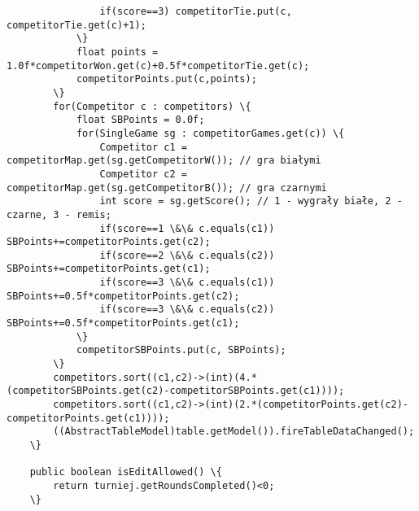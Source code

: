 \begin{verbatim}
				if(score==3) competitorTie.put(c, competitorTie.get(c)+1);
			\}
			float points = 1.0f*competitorWon.get(c)+0.5f*competitorTie.get(c);
			competitorPoints.put(c,points);
		\}
		for(Competitor c : competitors) \{
			float SBPoints = 0.0f;
			for(SingleGame sg : competitorGames.get(c)) \{
				Competitor c1 = competitorMap.get(sg.getCompetitorW()); // gra białymi
				Competitor c2 = competitorMap.get(sg.getCompetitorB()); // gra czarnymi
				int score = sg.getScore(); // 1 - wygrały białe, 2 - czarne, 3 - remis;
				if(score==1 \&\& c.equals(c1)) SBPoints+=competitorPoints.get(c2);
				if(score==2 \&\& c.equals(c2)) SBPoints+=competitorPoints.get(c1);
				if(score==3 \&\& c.equals(c1)) SBPoints+=0.5f*competitorPoints.get(c2);
				if(score==3 \&\& c.equals(c2)) SBPoints+=0.5f*competitorPoints.get(c1);
			\}
			competitorSBPoints.put(c, SBPoints);
		\}
		competitors.sort((c1,c2)->(int)(4.*(competitorSBPoints.get(c2)-competitorSBPoints.get(c1))));
		competitors.sort((c1,c2)->(int)(2.*(competitorPoints.get(c2)-competitorPoints.get(c1))));
		((AbstractTableModel)table.getModel()).fireTableDataChanged();
	\}
	
	public boolean isEditAllowed() \{
		return turniej.getRoundsCompleted()<0;
	\}
\end{verbatim}
